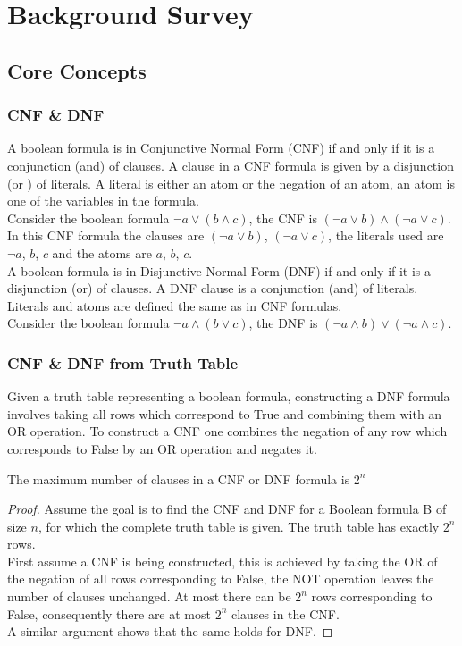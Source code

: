 \chapter{Background Survey}\label{C:backgroundsurvey}
\section{Core Concepts}
\subsection{CNF \& DNF}
A boolean formula is in Conjunctive Normal Form (CNF) if and only if it is a conjunction (and) of clauses. A clause in a CNF formula is given by a disjunction (or ) of literals. A literal is either an atom or the negation of an atom, an atom is one of the variables in the formula.\\

Consider the boolean formula $\lnot a \lor (b \land c)$, the CNF is $(\lnot a \lor b) \land (\lnot a \lor c)$. In this CNF formula the clauses are $(\lnot a \lor b)$, $(\lnot a \lor c)$, the literals used are $\lnot a$, $b$, $c$ and the atoms are $a$, $b$, $c$.\\

A boolean formula is in Disjunctive Normal Form (DNF) if and only if it is a disjunction (or) of clauses. A DNF clause is a conjunction (and) of literals. Literals and atoms are defined the same as in CNF formulas.\\

Consider the boolean formula $\lnot a \land (b \lor c)$, the DNF is $(\lnot a \land b) \lor (\lnot a \land c)$.\\

\subsection{CNF \& DNF from Truth Table}
Given a truth table representing a boolean formula, constructing a DNF formula involves taking all rows which correspond to True and combining them with an OR operation. To construct a CNF one combines the negation of any row which corresponds to False by an OR operation and negates it.

\begin{theorem}
	The maximum number of clauses in a CNF or DNF formula is $2^n$
	\label{thm:max-clause-cnfdnf}
\end{theorem}

\begin{proof}
	Assume the goal is to find the CNF and DNF for a Boolean formula B of size $n$, for which the complete truth table is given. The truth table has exactly $2^n$ rows.\\
	
	First assume a CNF is being constructed, this is achieved by taking the OR of the negation of all rows corresponding to False, the NOT operation leaves the number of clauses unchanged. At most there can be $2^n$ rows corresponding to False, consequently there are at most $2^n$ clauses in the CNF.\\
	
	A similar argument shows that the same holds for DNF.
\end{proof}


